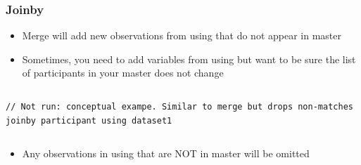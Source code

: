 \documentclass[table]{beamer}
\begin{document}
\begin{frame}[fragile]
\frametitle{Joinby}
\label{sec-6-10}

\begin{itemize}
\item Merge will add new observations from using
   that do not appear in master
\item Sometimes, you need to add variables from
   using but want to be sure the list of
   participants in your master does not change
\end{itemize}
\vspace{-.5em} \begin{columns}  \begin{block}{}

\begin{verbatim}
// Not run: conceptual exampe. Similar to merge but drops non-matches
joinby participant using dataset1
\end{verbatim}
\end{block} \end{columns}

\begin{itemize}
\item Any observations in using that are NOT in
   master will be omitted
\end{itemize}
\end{frame}
\end{document}
